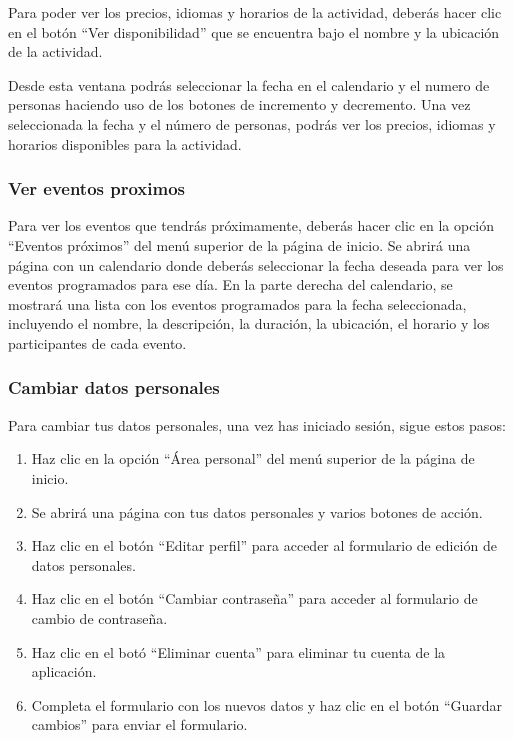 Para poder ver los precios, idiomas y horarios de la actividad, deberás hacer clic en el botón “Ver disponibilidad” que se encuentra bajo el nombre y la ubicación de la actividad.

Desde esta ventana podrás seleccionar la fecha en el calendario y el numero de personas haciendo uso de los botones de incremento y decremento.
Una vez seleccionada la fecha y el número de personas, podrás ver los precios, idiomas y horarios disponibles para la actividad.

\subsubsection{Ver eventos proximos}
Para ver los eventos que tendrás próximamente, deberás hacer clic en la opción “Eventos próximos” del menú superior de la página de inicio.
Se abrirá una página con un calendario donde deberás seleccionar la fecha deseada para ver los eventos programados para ese día.
En la parte derecha del calendario, se mostrará una lista con los eventos programados para la fecha seleccionada, incluyendo el nombre, la descripción, la duración, la ubicación, el horario y los participantes de cada evento.

\subsubsection{Cambiar datos personales}
Para cambiar tus datos personales, una vez has iniciado sesión, sigue estos pasos:
\begin{enumerate}
	\item Haz clic en la opción “Área personal” del menú superior de la página de inicio.
	\item Se abrirá una página con tus datos personales y varios botones de acción.
	\item Haz clic en el botón “Editar perfil” para acceder al formulario de edición de datos personales.
	\item Haz clic en el botón “Cambiar contraseña” para acceder al formulario de cambio de contraseña.
	\item Haz clic en el botó “Eliminar cuenta” para eliminar tu cuenta de la aplicación.
	\item Completa el formulario con los nuevos datos y haz clic en el botón “Guardar cambios” para enviar el formulario.
\end{enumerate}

